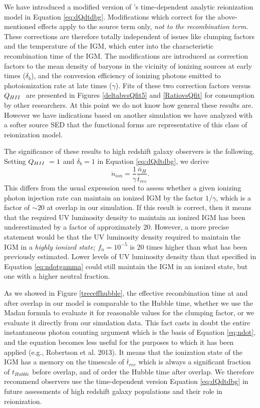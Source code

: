 We have introduced a modified version of \cite{MadauEtAl1999}'s time-dependent analytic reionization model in Equation \eqref{eq:dQdtdbg}. Modifications which correct for the above-mentioned effects apply to the source term only, {\em not to the recombination term}. These corrections are therefore totally independent of issues like clumping factors and the temperature of the IGM, which enter into the characteristic recombination time of the IGM. The modifications are introduced as correction factors to the mean density of baryons in the vicinity of ionizing sources at early times ($\delta_b$), and the conversion efficiency of ionizing photons emitted to \hi photoionization rate at late times ($\gamma$). Fits of these two correction factors versus $Q_{\hii}$ are presented in Figures \ref{deltabvsQfit5} and \ref{RatiovsQfit} for consumption by other researchers. At this point we do not know how general these results are. However we have indications based on another simulation we have analyzed with a softer source SED that the functional forms are representative of this class of reionization model. 

The significance of these results to high redshift galaxy observers is the following. Setting $Q_{\hii} = 1$ and $\delta_b = 1$ in Equation \eqref{eq:dQdtdbg}, we derive
\begin{equation}
\dot{n}_{ion} = \frac{1}{\gamma} \frac{\bar{n}_H}{\bar{t}_{rec}}.
\label{eq:ndotgamma}
\end{equation}
This differs from the usual expression used to assess whether a given ionizing photon injection rate can maintain an ionized IGM by the factor $1/\gamma$, which is a factor of $\sim 20$ at overlap in our simulation. If this result is correct, then it means that the required UV luminosity density to maintain an ionized IGM has been underestimated by a factor of approximately 20. However, a more precise statement would be that the UV luminosity density required to maintain the IGM in a {\em highly ionized state; $f_n =10^{-5}$} is 20 times higher than what has been previously estimated. Lower levels of UV luminosity density than that specified in Equation \eqref{eq:ndotgamma} could still maintain the IGM in an ionized state, but one with a higher neutral fraction. 

As we showed in Figure \ref{treceffhubble}, the effective recombination time at and after overlap in our model is comparable to the Hubble time, whether we use the Madau formula to evaluate it for reasonable values for the clumping factor, or we evaluate it directly from our simulation data. This fact casts in doubt the entire instantaneous photon counting argument which is the basis of Equation \ref{eq:ndot}, and the equation becomes less useful for the purposes to which it has been applied (e.g., Robertson et al. 2013). It means that the ionization state of the IGM has a memory on the timescale of $\bar{t}_{rec}$ which is always a significant fraction of $t_{Hubble}$ before overlap, and of order the Hubble time after overlap. We therefore recommend observers use the time-dependent version Equation \eqref{eq:dQdtdbg} in future assessments of high redshift galaxy populations and their role in reionization. 

